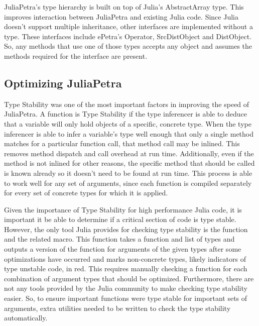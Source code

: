 \documentclass[acmsmall]{acmart}
\newcommand{\juliaSnippet}[1]{\texttt{\detokenize{#1}}}
\begin{document}
JuliaPetra's type hierarchy is built on top of Julia's AbstractArray type.  This improves
interaction between JuliaPetra and existing Julia code.
Since Julia doesn't support multiple inheritance, %
other interfaces are implemented without a type.
These interfaces include ePetra's Operator, SrcDistObject and DistObject.
So, any methods that use one of those types accepts any object and assumes
the methods required for the interface are present.

\subsection{Optimizing JuliaPetra}

Type Stability was one of the most important factors in improving the speed of JuliaPetra.
A function is Type Stability if the type inferencer is able to deduce that a variable will only
hold objects of a specific, concrete type.
When the type inferencer is able to infer a variable's type well enough that only a single
method matches for a particular function call, that method call may be inlined. \cite{JuliaDesignPaper}
This removes method dispatch and call overhead at run time.
Additionally, even if the method is not inlined for other reasons, the specific method that should
be called is known already so it doesn't need to be found at run time.
This process is able to work well for any set of arguments, since each function is compiled
separately for every set of concrete types for which it is applied.  \cite{JuliaFreshApproach}

Given the importance of Type Stability for high performance Julia code, it is important it be able
to determine if a critical section of code is type stable.
However, the only tool Julia provides for checking type stability is the \juliaSnippet{code_warntype}
function and the related \juliaSnippet{@code_warntype} macro.  This function takes a function and list
of types and outputs a version of the function for arguments of the given types after some optimizations
have occurred and marks non-concrete types, likely indicators of type unstable code, in red.
This requires manually checking a function for each combination of argument types that should be optimized.
Furthermore, there are not any tools provided by the Julia community to make checking type stability easier.
So, to ensure important functions were type stable for important sets of arguments,
extra utilities needed to be written to check the type stability automatically.
\end{document}
